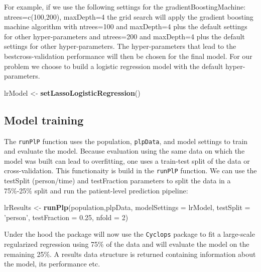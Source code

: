 \documentclass[]{article}
\newenvironment{Shaded}{\begin{snugshade}}{\end{snugshade}}
\newcommand{\KeywordTok}[1]{\textcolor[rgb]{0.13,0.29,0.53}{\textbf{#1}}}
\newcommand{\DataTypeTok}[1]{\textcolor[rgb]{0.13,0.29,0.53}{#1}}
\newcommand{\DecValTok}[1]{\textcolor[rgb]{0.00,0.00,0.81}{#1}}
\newcommand{\FloatTok}[1]{\textcolor[rgb]{0.00,0.00,0.81}{#1}}
\newcommand{\StringTok}[1]{\textcolor[rgb]{0.31,0.60,0.02}{#1}}
\newcommand{\NormalTok}[1]{#1}
\begin{document}
For example, if we use the following settings for the
gradientBoostingMachine: ntrees=c(100,200), maxDepth=4 the grid search
will apply the gradient boosting machine algorithm with ntrees=100 and
maxDepth=4 plus the default settings for other hyper-parameters and
ntrees=200 and maxDepth=4 plus the default settings for other
hyper-parameters. The hyper-parameters that lead to the
bestcross-validation performance will then be chosen for the final
model. For our problem we choose to build a logistic regression model
with the default hyper-parameters.

\begin{Shaded}
\begin{Highlighting}[]
\NormalTok{lrModel <-}\StringTok{ }\KeywordTok{setLassoLogisticRegression}\NormalTok{()}
\end{Highlighting}
\end{Shaded}

\subsection{Model training}\label{model-training}

The \texttt{runPlP} function uses the population, \texttt{plpData}, and
model settings to train and evaluate the model. Because evaluation using
the same data on which the model was built can lead to overfitting, one
uses a train-test split of the data or cross-validation. This
functionaity is build in the \texttt{runPlP} function. We can use the
testSplit (person/time) and testFraction parameters to split the data in
a 75\%-25\% split and run the patient-level prediction pipeline:

\begin{Shaded}
\begin{Highlighting}[]
\NormalTok{lrResults <-}\StringTok{ }\KeywordTok{runPlp}\NormalTok{(population,plpData, }\DataTypeTok{modelSettings =}\NormalTok{ lrModel, }\DataTypeTok{testSplit =} \StringTok{'person'}\NormalTok{,  }
\DataTypeTok{testFraction =} \FloatTok{0.25}\NormalTok{, }\DataTypeTok{nfold =} \DecValTok{2}\NormalTok{)}
\end{Highlighting}
\end{Shaded}

Under the hood the package will now use the \texttt{Cyclops} package to
fit a large-scale regularized regression using 75\% of the data and will
evaluate the model on the remaining 25\%. A results data structure is
returned containing information about the model, its performance etc.
\end{document}
